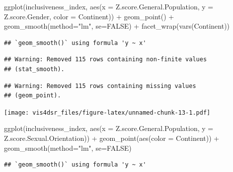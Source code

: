 \documentclass[
]{krantz}
\makeatletter
\newenvironment{Shaded}{\begin{snugshade}}{\end{snugshade}}
\newcommand{\AttributeTok}[1]{\textcolor[rgb]{0.61,0.61,0.61}{#1}}
\newcommand{\ConstantTok}[1]{\textcolor[rgb]{0,0,0}{#1}}
\newcommand{\FunctionTok}[1]{\textcolor[rgb]{0,0,0}{#1}}
\newcommand{\NormalTok}[1]{#1}
\newcommand{\SpecialCharTok}[1]{\textcolor[rgb]{0,0,0}{#1}}
\newcommand{\StringTok}[1]{\textcolor[rgb]{0.5,0.5,0.5}{#1}}
\newenvironment{kframe}{%
\medskip{}
\setlength{\fboxsep}{.8em}
 \def\at@end@of@kframe{}%
 \ifinner\ifhmode%
  \def\at@end@of@kframe{\end{minipage}}%
  \begin{minipage}{\columnwidth}%
 \fi\fi%
 \def\FrameCommand##1{\hskip\@totalleftmargin \hskip-\fboxsep
 \colorbox{shadecolor}{##1}\hskip-\fboxsep
     \hskip-\linewidth \hskip-\@totalleftmargin \hskip\columnwidth}%
 \MakeFramed {\advance\hsize-\width
   \@totalleftmargin\z@ \linewidth\hsize
   \@setminipage}}%
 {\par\unskip\endMakeFramed%
 \at@end@of@kframe}
\renewenvironment{Shaded}{\begin{kframe}}{\end{kframe}}
\makeatother
\begin{document}
\begin{Shaded}
\begin{Highlighting}[]
\FunctionTok{ggplot}\NormalTok{(inclusiveness\_index, }
       \FunctionTok{aes}\NormalTok{(}\AttributeTok{x =}\NormalTok{ Z.score.General.Population, }
           \AttributeTok{y =}\NormalTok{ Z.score.Gender,}
           \AttributeTok{color =}\NormalTok{ Continent)) }\SpecialCharTok{+}
  \FunctionTok{geom\_point}\NormalTok{() }\SpecialCharTok{+}
  \FunctionTok{geom\_smooth}\NormalTok{(}\AttributeTok{method=}\StringTok{"lm"}\NormalTok{, }\AttributeTok{se=}\ConstantTok{FALSE}\NormalTok{) }\SpecialCharTok{+} 
  \FunctionTok{facet\_wrap}\NormalTok{(}\FunctionTok{vars}\NormalTok{(Continent))}
\end{Highlighting}
\end{Shaded}

\begin{verbatim}
## `geom_smooth()` using formula 'y ~ x'
\end{verbatim}

\begin{verbatim}
## Warning: Removed 115 rows containing non-finite values
## (stat_smooth).
\end{verbatim}

\begin{verbatim}
## Warning: Removed 115 rows containing missing values
## (geom_point).
\end{verbatim}

\texttt{[image: vis4dsr\_files/figure-latex/unnamed-chunk-13-1.pdf]}

\begin{Shaded}
\begin{Highlighting}[]
\FunctionTok{ggplot}\NormalTok{(inclusiveness\_index, }
       \FunctionTok{aes}\NormalTok{(}\AttributeTok{x =}\NormalTok{ Z.score.General.Population, }
           \AttributeTok{y =}\NormalTok{ Z.score.Sexual.Orientation)) }\SpecialCharTok{+}
  \FunctionTok{geom\_point}\NormalTok{(}\FunctionTok{aes}\NormalTok{(}\AttributeTok{color =}\NormalTok{ Continent)) }\SpecialCharTok{+}
  \FunctionTok{geom\_smooth}\NormalTok{(}\AttributeTok{method=}\StringTok{"lm"}\NormalTok{, }\AttributeTok{se=}\ConstantTok{FALSE}\NormalTok{)}
\end{Highlighting}
\end{Shaded}

\begin{verbatim}
## `geom_smooth()` using formula 'y ~ x'
\end{verbatim}
\end{document}
